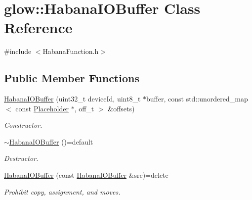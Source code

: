\hypertarget{classglow_1_1_habana_i_o_buffer}{}\section{glow\+:\+:Habana\+I\+O\+Buffer Class Reference}
\label{classglow_1_1_habana_i_o_buffer}


{\ttfamily \#include $<$Habana\+Function.\+h$>$}

\subsection*{Public Member Functions}
\begin{DoxyCompactItemize}
\item 
\mbox{\label{classglow_1_1_habana_i_o_buffer_aa0d5cd030331fa31139d95aaa0f6e1e6}} 
\hyperlink{classglow_1_1_habana_i_o_buffer_aa0d5cd030331fa31139d95aaa0f6e1e6}{Habana\+I\+O\+Buffer} (uint32\+\_\+t device\+Id, uint8\+\_\+t $\ast$buffer, const std\+::unordered\+\_\+map$<$ const \hyperlink{classglow_1_1_placeholder}{Placeholder} $\ast$, off\+\_\+t $>$ \&offsets)
\begin{DoxyCompactList}\small\item\em Constructor. \end{DoxyCompactList}\item 
\mbox{\label{classglow_1_1_habana_i_o_buffer_ab1a5b8cef9f8f4c19b6adb0ee39d1591}} 
\hyperlink{classglow_1_1_habana_i_o_buffer_ab1a5b8cef9f8f4c19b6adb0ee39d1591}{$\sim$\+Habana\+I\+O\+Buffer} ()=default
\begin{DoxyCompactList}\small\item\em Destructor. \end{DoxyCompactList}\item 
\mbox{\label{classglow_1_1_habana_i_o_buffer_aa6ee6c9f360c0e18b7efef71328a5d39}} 
\hyperlink{classglow_1_1_habana_i_o_buffer_aa6ee6c9f360c0e18b7efef71328a5d39}{Habana\+I\+O\+Buffer} (const \hyperlink{classglow_1_1_habana_i_o_buffer}{Habana\+I\+O\+Buffer} \&src)=delete
\begin{DoxyCompactList}\small\item\em Prohibit copy, assignment, and moves. \end{DoxyCompactList}\item 

\end{DoxyCompactItemize}

